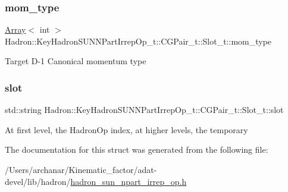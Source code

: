 \subsubsection{\texorpdfstring{mom\_type}{mom\_type}}
{\footnotesize\ttfamily \mbox{\hyperlink{classXMLArray_1_1Array}{Array}}$<$ int $>$ Hadron\+::\+Key\+Hadron\+S\+U\+N\+N\+Part\+Irrep\+Op\+\_\+t\+::\+C\+G\+Pair\+\_\+t\+::\+Slot\+\_\+t\+::mom\+\_\+type}

Target D-\/1 Canonical momentum type \mbox{\label{structHadron_1_1KeyHadronSUNNPartIrrepOp__t_1_1CGPair__t_1_1Slot__t_aac0f3ecb03784adb64cac8f9960608bd}} 
\subsubsection{\texorpdfstring{slot}{slot}}
{\footnotesize\ttfamily std\+::string Hadron\+::\+Key\+Hadron\+S\+U\+N\+N\+Part\+Irrep\+Op\+\_\+t\+::\+C\+G\+Pair\+\_\+t\+::\+Slot\+\_\+t\+::slot}

At first level, the Hadron\+Op index, at higher levels, the temporary 

The documentation for this struct was generated from the following file\+:\begin{DoxyCompactItemize}
\item 
/\+Users/archanar/\+Kinematic\+\_\+factor/adat-\/devel/lib/hadron/\mbox{\hyperlink{adat-devel_2lib_2hadron_2hadron__sun__npart__irrep__op_8h}{hadron\+\_\+sun\+\_\+npart\+\_\+irrep\+\_\+op.\+h}}\end{DoxyCompactItemize}
